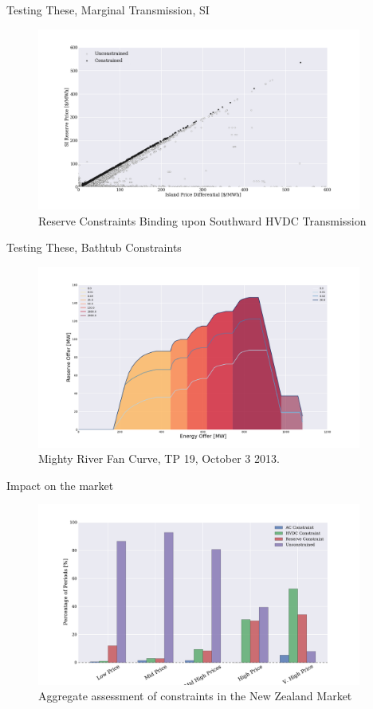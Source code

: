 \documentclass[xcolor=x11names,compress]{beamer}
\renewcommand{\(}{\begin{columns}}
\renewcommand{\)}{\end{columns}}
\newcommand{\<}[1]{\begin{column}{#1}}
\renewcommand{\>}{\end{column}}
\begin{document}
\begin{frame}{Testing These, Marginal Transmission, SI}
\begin{figure}
\includegraphics[width=0.95\textwidth]{img/si_reserve_prices_island_differential.png}
\caption{Reserve Constraints Binding upon Southward HVDC Transmission}
\end{figure}
\end{frame}

\begin{frame}{Testing These, Bathtub Constraints}
\begin{figure}
\includegraphics[width=0.95\textwidth]{img/mrpl_fan_curve.png}
\caption{Mighty River Fan Curve, TP 19, October 3 2013.}
\end{figure}
\end{frame}

\begin{frame}{Impact on the market}
\begin{figure}
\includegraphics[width=0.95\textwidth]{img/constrained_periods_analysis.pdf}
\caption{Aggregate assessment of constraints in the New Zealand Market}
\end{figure}
\end{frame}
\end{document}
